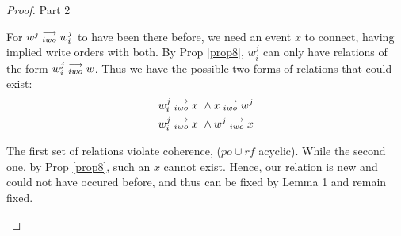\begin{proof}{Part 2}
\begin{itemize}
                        For $w^j\stackrel{\longrightarrow}{_{iwo}}w_i^j$ to have been there before, we need an event $x$ to connect, having implied write orders with both. By Prop \ref{prop8}, $w_i^j$ can only have relations of the form  $w_i^j\stackrel{\longrightarrow}{_{iwo}}w$. Thus we have the possible two forms of relations that could exist:
                        \begin{align*}
                            w_i^j\stackrel{\longrightarrow}{_{iwo}}x \ \wedge x\stackrel{\longrightarrow}{_{iwo}}w^j \\ 
                            w_i^j\stackrel{\longrightarrow}{_{iwo}}x \ \wedge w^j\stackrel{\longrightarrow}{_{iwo}}x \\ 
                        \end{align*}

                        The first set of relations violate coherence, ($po \cup rf$ acyclic). While the second one, by Prop \ref{prop8}, such an $x$ cannot exist. Hence, our relation is new and could not have occured before, and thus can be fixed by Lemma 1 and remain fixed.

                \end{itemize}

            
        \end{proof}
   